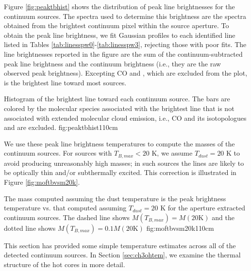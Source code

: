 \documentclass{emulateapj}
\begin{document}
Figure \ref{fig:peaktbhist} shows the distribution of peak line brightnesses
for the continuum sources.  The spectra used to determine this brightness are
the spectra obtained from the brightest continuum pixel within the source
aperture.  To obtain the peak line brightness, we fit Gaussian profiles to each
identified line listed in Tables \ref{tab:linesspw0}-\ref{tab:linesspw3},
rejecting those with poor fits.  The line brightnesses reported in the figure
are the sum of the continuum-subtracted peak line brightness and the continuum
brightness (i.e., they are the raw observed peak brightness).  Excepting CO and
\formaldehyde, which are excluded from the plot, \methanol is the brightest
line toward most sources. 

{Histogram of the brightest line toward each continuum source.
The bars are colored by the molecular species associated with the brightest
line that is not associated with extended molecular cloud emission,
i.e., CO and its isotopologues and \formaldehyde are excluded.}
{fig:peaktbhist}{1}{10cm}

We use these peak line brightness temperatures to compute the masses of the
continuum sources.  For sources with $T_{B,max} < 20$ K, we assume $T_{dust} =
20$ K to avoid producing unreasonably high masses; in such sources the lines
are likely to be optically thin and/or subthermally excited.  This correction is
illustrated in Figure \ref{fig:moftbvsm20k}.

{The mass computed assuming the dust temperature is the peak brightness
temperature vs. that computed assuming $T_{dust}=20$ K  for the aperture extracted
continuum sources.
The dashed line shows $M(T_{B,max}) =
M(20\textrm{K})$ and the dotted line shows $M(T_{B,max}) = 0.1 
M(20\textrm{K})$ 
}{fig:moftbvsm20k}{1}{10cm}

This section has provided some simple temperature estimates across all of the
detected continuum sources.  In Section \ref{sec:ch3ohtem}, we  examine
the thermal structure of the hot cores in more detail.

\end{document}
